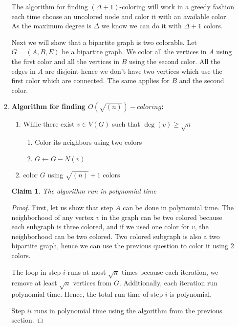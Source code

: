 \documentclass{article}
\newtheorem{claim}[section]{Claim}
\begin{document}
\begin{enumerate}
\begin{enumerate}
The algorithm for finding $(\Delta+1)$-coloring will work in a greedy fashion each time choose an uncolored node and color it with an available color. As the maximum degree is $\Delta$ we know we can do it with $\Delta +1$ colors.

Next we will show that a bipartite graph is two colorable. Let $G = (A, B, E)$ be a bipartite graph. We color all the vertices in $A$ using the first color and all the vertices in $B$ using the second color. All the edges in $A$ are disjoint hence we don't have two vertices which use the first color which are connected. The same applies for $B$ and the second color.
	\item \textbf{Algorithm for finding $O(\sqrt{(n)})-coloring$:}
	\begin{enumerate}
		\item While there exist $v \in V(G)$ such that $\deg(v) \geq \sqrt{n}$
		\begin{enumerate}
			\item Color its neighbors using two colors
			\item $G \leftarrow G - N(v)$
		\end{enumerate}
		\item color $G$ using $\sqrt{(n)} + 1$ colors
	\end{enumerate}
	

	\begin{claim}
		The algorithm run in polynomial time
\end{claim}
\begin{proof}
	First, let us show that step $A$ can be done in polynomial time. The neighborhood of any vertex $v$ in the graph can be two colored because each subgraph is three colored, and if we used one color for $v$, the neighborhood can be two colored. Two colored subgraph is also a two bipartite graph, hence we can use the previous question to color it using 2 colors.
	
	The loop in step $i$ runs at most $\sqrt{n}$ times because each iteration, we remove at least $\sqrt{n}$ vertices from $G$. Additionally, each iteration run polynomial time. Hence, the total run time of step $i$ is polynomial.
	
	Step $ii$ runs in polynomial time using the algorithm from the previous section.
\end{proof}


\end{enumerate}
\end{enumerate}
\end{document}
